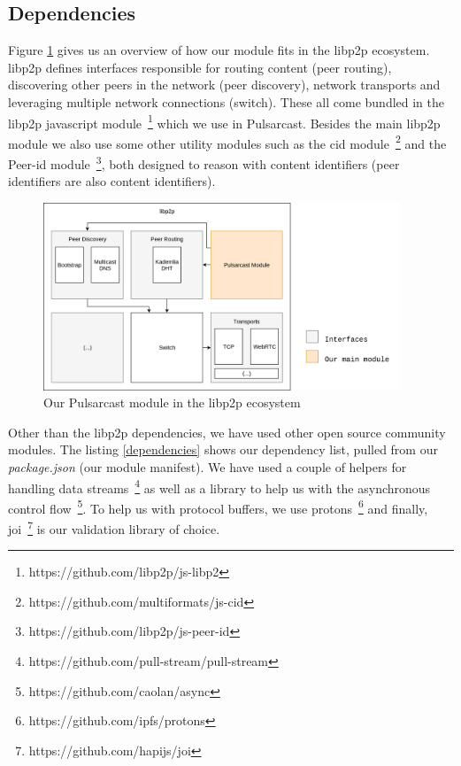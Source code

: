 \subsection{Dependencies}\label{subsec:dependencies}

Figure \ref{fig:pulsarcast-in-libp2p} gives us an overview of how our module
fits in the libp2p ecosystem. libp2p defines interfaces responsible for routing
content (peer routing), discovering other peers in the network (peer
discovery), network transports and leveraging multiple network connections
(switch). These all come bundled in the libp2p javascript
module~\footnote{https://github.com/libp2p/js-libp2} which we use in
Pulsarcast. Besides the main libp2p module we also use some other utility
modules such as the \acrshort{cid}
module~\footnote{https://github.com/multiformats/js-cid} and the Peer-id
module~\footnote{https://github.com/libp2p/js-peer-id}, both designed to reason
with content identifiers (peer identifiers are also content identifiers). 

\begin{figure}[hb!]
  \centering
  \includegraphics[width=0.95\textwidth]{img/pulsarcast-in-libp2p.png}
  \caption{Our Pulsarcast module in the libp2p ecosystem}
  \label{fig:pulsarcast-in-libp2p}
\end{figure}

Other than the libp2p dependencies, we have used other open source community
modules. The listing \ref{dependencies} shows our dependency list, pulled from our \emph{package.json} (our module manifest). We have used a couple of helpers
for handling data streams~\footnote{https://github.com/pull-stream/pull-stream}
as well as a library to help us with the asynchronous control
flow~\footnote{https://github.com/caolan/async}. To help us with protocol
buffers, we use protons~\footnote{https://github.com/ipfs/protons} and finally,
joi~\footnote{https://github.com/hapijs/joi} is our validation library of
choice.

